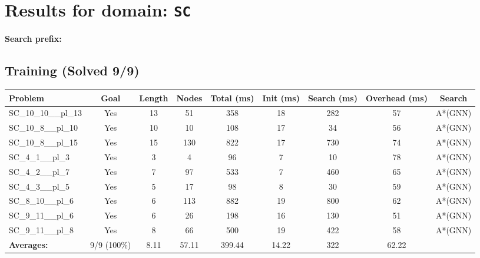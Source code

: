 \documentclass{article}
\begin{document}
\section*{Results for domain: \texttt{SC}}
\textbf{Search prefix:} 
\\[0.5cm]
\subsection*{Training (Solved 9/9)}
\begin{tabular}{lcccccccc}
\toprule
Problem & Goal & Length & Nodes & Total (ms) & Init (ms) & Search (ms) & Overhead (ms) & Search \\
\midrule
SC\_10\_10\_\_pl\_13 & Yes & 13 & 51 & 358 & 18 & 282 & 57 & A*(GNN) \\
SC\_10\_8\_\_pl\_10 & Yes & 10 & 10 & 108 & 17 & 34 & 56 & A*(GNN) \\
SC\_10\_8\_\_pl\_15 & Yes & 15 & 130 & 822 & 17 & 730 & 74 & A*(GNN) \\
SC\_4\_1\_\_pl\_3 & Yes & 3 & 4 & 96 & 7 & 10 & 78 & A*(GNN) \\
SC\_4\_2\_\_pl\_7 & Yes & 7 & 97 & 533 & 7 & 460 & 65 & A*(GNN) \\
SC\_4\_3\_\_pl\_5 & Yes & 5 & 17 & 98 & 8 & 30 & 59 & A*(GNN) \\
SC\_8\_10\_\_pl\_6 & Yes & 6 & 113 & 882 & 19 & 800 & 62 & A*(GNN) \\
SC\_9\_11\_\_pl\_6 & Yes & 6 & 26 & 198 & 16 & 130 & 51 & A*(GNN) \\
SC\_9\_11\_\_pl\_8 & Yes & 8 & 66 & 500 & 19 & 422 & 58 & A*(GNN) \\
\textbf{Averages:} & 9/9 (100\%) & 8.11 & 57.11 & 399.44 & 14.22 & 322 & 62.22 & \\
\bottomrule
\end{tabular}
\\[0.7cm]
\end{document}
